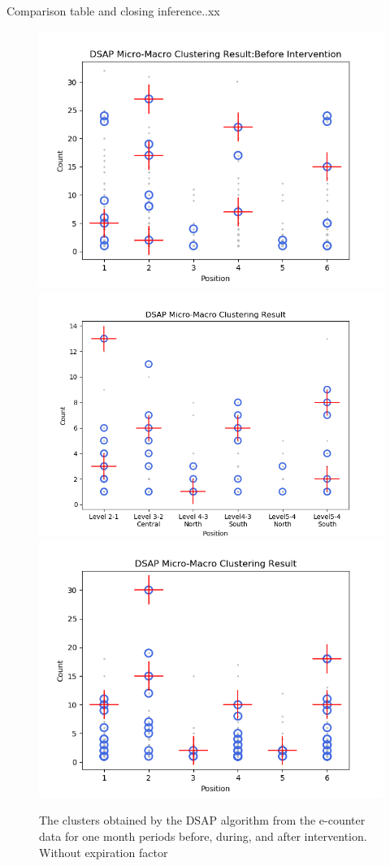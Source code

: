 \documentclass[../UNBThesis2.tex]{subfiles}
\begin{document}
Comparison table and closing inference..xx
\begin{figure}[!h]
    \centering
    \includegraphics[width=.47\textwidth]{image/Chapters/Chapter6/DSAPBeforeMonthIntervention.png}
    \includegraphics[width=.51\textwidth]{image/Chapters/Chapter6/window10H.png}
    \includegraphics[width=.49\textwidth]{image/Chapters/Chapter6/DSAPAFTERmonthIntervention.png}
    \caption{The clusters obtained by the DSAP algorithm from the e-counter data for one month periods before, during, and after intervention. Without expiration factor}
    \label{dsap3mon}
\end{figure}



\end{document}
